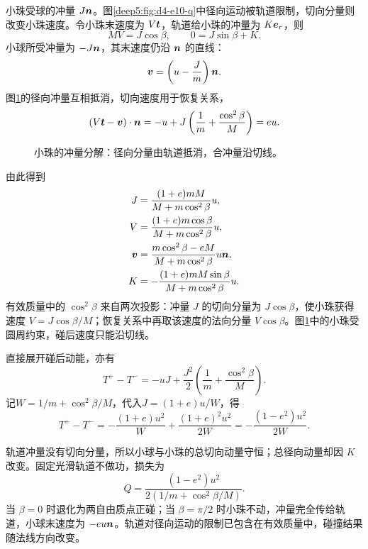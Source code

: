 \begin{solution}
小珠受球的冲量 $J\bm{n}$。图\ref{deep5:fig:d4-e10-q}中径向运动被轨道限制，切向分量则改变小珠速度。令小珠末速度为 $V\bm{t}$，轨道给小珠的冲量为 $K\bm{e}_r$，则
\begin{equation}
 MV=J\cos\beta,\qquad 0=J\sin\beta+K.
\end{equation}
小球所受冲量为 $-J\bm{n}$，其末速度仍沿 $\bm{n}$ 的直线：
\begin{equation}
 \bm{v}=\left(u-\frac Jm\right)\bm{n}.
\end{equation}
图\ref{deep5:fig:d4-e10-s}的径向冲量互相抵消，切向速度用于恢复关系，
\begin{equation}
 (V\bm{t}-\bm{v})\cdot\bm{n}
 =-u+J\left(\frac1m+\frac{\cos^2\beta}{M}\right)=eu.
\end{equation}
\begin{figure}[H]\centering
{}
\caption{小珠的冲量分解：径向分量由轨道抵消，合冲量沿切线。}\label{deep5:fig:d4-e10-s}
\end{figure}
由此得到
\begin{align}
 J&=\frac{(1+e)mM}{M+m\cos^2\beta}u,\\
 V&=\frac{(1+e)m\cos\beta}{M+m\cos^2\beta}u,\\
 \bm{v}&=\frac{m\cos^2\beta-eM}{M+m\cos^2\beta}u\bm{n},\\
 K&=-\frac{(1+e)mM\sin\beta}{M+m\cos^2\beta}u.
\end{align}
有效质量中的 $\cos^2\beta$ 来自两次投影：冲量 $J$ 的切向分量为 $J\cos\beta$，使小珠获得速度 $V=J\cos\beta/M$；恢复关系中再取该速度的法向分量 $V\cos\beta$。图\ref{deep5:fig:d4-e10-s}中的小珠受圆周约束，碰后速度只能沿切线。

直接展开碰后动能，亦有
\[
T^+-T^-=-uJ+\frac{J^2}{2}
\left(\frac1m+\frac{\cos^2\beta}{M}\right).
\]
记$W=1/m+\cos^2\beta/M$，代入$J=(1+e)u/W$，得
\[
T^+-T^-=-\frac{(1+e)u^2}{W}+\frac{(1+e)^2u^2}{2W}
=-\frac{(1-e^2)u^2}{2W}.
\]

轨道冲量没有切向分量，所以小球与小珠的总切向动量守恒；总径向动量却因 $K$ 改变。固定光滑轨道不做功，损失为
\begin{equation}
 Q=\frac{(1-e^2)u^2}{2(1/m+\cos^2\beta/M)}.
\end{equation}
当 $\beta=0$ 时退化为两自由质点正碰；当 $\beta=\pi/2$ 时小珠不动，冲量完全传给轨道，小球末速度为 $-eu\bm{n}$。轨道对径向运动的限制已包含在有效质量中，碰撞结果随法线方向改变。
\end{solution}



